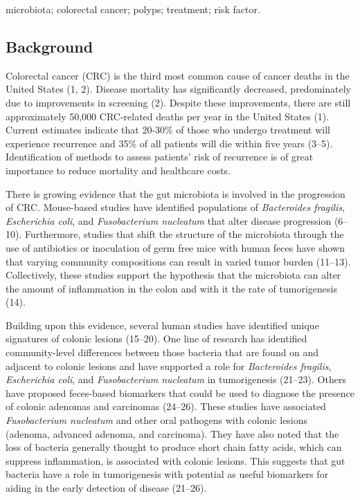 \documentclass[12pt,]{article}
\begin{document}
microbiota; colorectal cancer; polyps; treatment; risk factor.

\newpage

\subsection{Background}\label{background}

Colorectal cancer (CRC) is the third most common cause of cancer deaths
in the United States (1, 2). Disease mortality has significantly
decreased, predominately due to improvements in screening (2). Despite
these improvements, there are still approximately 50,000 CRC-related
deaths per year in the United States (1). Current estimates indicate
that 20-30\% of those who undergo treatment will experience recurrence
and 35\% of all patients will die within five years (3--5).
Identification of methods to assess patients' risk of recurrence is of
great importance to reduce mortality and healthcare costs.

There is growing evidence that the gut microbiota is involved in the
progression of CRC. Mouse-based studies have identified populations of
\emph{Bacteroides fragilis}, \emph{Escherichia coli}, and
\emph{Fusobacterium nucleatum} that alter disease progression (6--10).
Furthermore, studies that shift the structure of the microbiota through
the use of antibiotics or inoculation of germ free mice with human feces
have shown that varying community compositions can result in varied
tumor burden (11--13). Collectively, these studies support the
hypothesis that the microbiota can alter the amount of inflammation in
the colon and with it the rate of tumorigenesis (14).

Building upon this evidence, several human studies have identified
unique signatures of colonic lesions (15--20). One line of research has
identified community-level differences between those bacteria that are
found on and adjacent to colonic lesions and have supported a role for
\emph{Bacteroides fragilis}, \emph{Escherichia coli}, and
\emph{Fusobacterium nucleatum} in tumorigenesis (21--23). Others have
proposed feces-based biomarkers that could be used to diagnose the
presence of colonic adenomas and carcinomas (24--26). These studies have
associated \emph{Fusobacterium nucleatum} and other oral pathogens with
colonic lesions (adenoma, advanced adenoma, and carcinoma). They have
also noted that the loss of bacteria generally thought to produce short
chain fatty acids, which can suppress inflammation, is associated with
colonic lesions. This suggests that gut bacteria have a role in
tumorigenesis with potential as useful biomarkers for aiding in the
early detection of disease (21--26).
\end{document}
